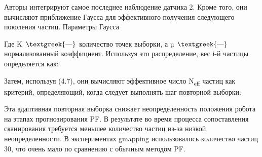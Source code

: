 \documentclass[a4paper]{article}
\begin{document}
Авторы интегрируют самое последнее наблюдение датчика 2. Кроме того, они вычисляют приближение Гаусса для эффективного
получения следующего поколения частиц. Параметры Гаусса




Где K $\text{\textgreek{—}}$ количество точек выборки, а µ $\text{\textgreek{—}}$ нормализованный коэффициент. Используя
это распределение, вес i-й частицы определяется как:




Затем, используя (4.7), они вычисляют эффективное число N\foreignlanguage{english}{\textsubscript{eff}} частиц как
критерий, определяющий, когда следует выполнять шаг повторной выборки:

Эта адаптивная повторная выборка снижает неопределенность положения робота на этапах прогнозирования PF. В результате во
время процесса сопоставления сканирования требуется меньшее количество частиц из-за низкой неопределенности. В
экспериментах gmapping использовалось количество частиц 30, что очень мало по сравнению с обычным методом PF.
\end{document}
